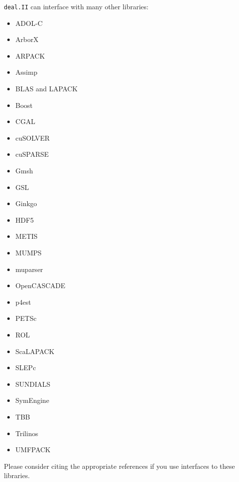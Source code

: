 \documentclass{ansarticle-preprint}
\newcommand{\specialword}[1]{\texttt{#1}}
\newcommand{\dealii}{{\specialword{deal.II}}\xspace}
\begin{document}
\dealii can interface with many other libraries:
\begin{multicols}{3}
  \begin{itemize}[leftmargin=4mm]
    \item ADOL-C \cite{griewank1996adolc}
    \item ArborX \cite{lebrun2020arborx}
    \item ARPACK \cite{lehoucq1998arpack}
    \item Assimp \cite{schulze2021assimp}
    \item BLAS and LAPACK \cite{anderson1999lapack}
    \item Boost \cite{boost-web-page}
    \item CGAL \cite{cgal-user-ref}
    \item cuSOLVER \cite{cusolver-web-page}
    \item cuSPARSE \cite{cusparse-web-page}
    \item Gmsh \cite{geuzaine2009gmsh}
    \item GSL \cite{galassi2009gsl,gsl-web-page}
    \item Ginkgo \cite{anzt2020ginkgo,anzt2022ginkgo}
    \item HDF5 \cite{hdf5-web-page}
    \item METIS \cite{karypis1998metis}
    \item MUMPS \cite{amestoy2001mumps,amestoy2019mumps}
    \item muparser \cite{muparser-web-page}
    \item OpenCASCADE \cite{opencascade-web-page}
    \item p4est \cite{burstedde2011p4est,burstedde2020parallel}
    \item PETSc \cite{petsc-user-ref,petsc-web-page}
    \item ROL \cite{ridzal2014rol}
    \item ScaLAPACK \cite{blackford1997scalapack}
    \item SLEPc \cite{hernandez2005slepc}
    \item SUNDIALS \cite{hindmarsh2005sundials}
    \item SymEngine \cite{symengine-web-page}
    \item TBB \cite{reinders2007tbb}
    \item Trilinos \cite{heroux2005trilinos,trilinos-web-page}
    \item UMFPACK \cite{davis2004umfpack}
  \end{itemize}
\end{multicols}
Please consider citing the appropriate references if you use
interfaces to these libraries.
\end{document}
